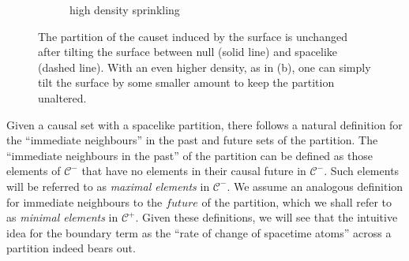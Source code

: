 \documentclass[12pt]{article}
\begin{document}
\begin{figure}
\begin{subfigure}[b]{0.49\textwidth}
                \caption{high density sprinkling}
                \label{fig:high_density_sprinkling_with_null_and_spacelike}
        \end{subfigure}
        \caption{The partition of the causet induced by the surface is unchanged after tilting the surface between null (solid line) and spacelike (dashed line). With an even higher density, as in (b), one can simply tilt the surface by some smaller amount to keep the partition unaltered.}\label{fig:animals}
\end{figure}

Given a causal set with a spacelike partition, there follows a natural definition for the ``immediate neighbours'' in the past and future sets of the partition. The ``immediate neighbours in the past'' of the partition can be defined as those elements of $\mathcal{C}^-$ that have no elements in their causal future in $\mathcal{C}^-$. Such elements will be referred to as \textit{maximal elements} in $\mathcal{C}^-$. We assume an analogous definition for immediate neighbours to the $future$ of the partition, which we shall refer to as \emph{minimal elements} in $\mathcal{C}^+$. Given these definitions, we will see that the intuitive idea for the boundary term as the ``rate of change of spacetime atoms'' across a partition indeed bears out.
\end{document}
